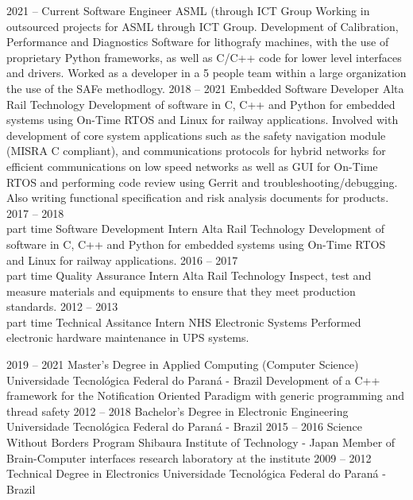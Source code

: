 \documentclass[9pt]{developercv} %
\begin{document}
\begin{entrylist}
	\entry
		{2021 -- Current}
		{Software Engineer}
		{ASML (through ICT Group}
		{Working in outsourced projects for ASML through ICT Group. Development of Calibration, Performance and Diagnostics Software for lithografy machines, with the use of proprietary Python frameworks, as well as C/C++ code for lower level interfaces and drivers. Worked as a developer in a 5 people team within a large organization the use of the SAFe methodlogy.}
	\entry
		{2018 -- 2021}
		{Embedded Software Developer}
		{Alta Rail Technology}
		{Development of software in C, C++ and Python for embedded systems using On-Time RTOS and
		Linux for railway applications. Involved with development of core system applications such
		as the safety navigation module (MISRA C compliant), and communications protocols for hybrid
		networks for efficient communications on low speed networks as well as GUI for On-Time RTOS
		and performing code review using Gerrit and troubleshooting/debugging. Also writing functional
		specification and risk analysis documents for products.}
	\entry
		{2017 -- 2018\\\footnotesize{part time}}
		{Software Development Intern}
		{Alta Rail Technology}
		{Development of software in C, C++ and Python for embedded systems using On-Time RTOS and 
		Linux for railway applications.}
	\entry
		{2016 -- 2017\\\footnotesize{part time}}
		{Quality Assurance Intern}
		{Alta Rail Technology}
		{Inspect, test and measure materials and equipments to ensure that they meet production standards.}
	\entry
		{2012 -- 2013\\\footnotesize{part time}}
		{Technical Assitance Intern}
		{NHS Electronic Systems}
		{Performed electronic hardware maintenance in UPS systems.}
\end{entrylist}



\begin{entrylist}
	\entry
		{2019 -- 2021}
		{Master's Degree in Applied Computing (Computer Science)}
		{Universidade Tecnológica Federal do Paraná - Brazil}
		{Development of a C++ framework for the Notification Oriented Paradigm with generic programming and thread safety}
	\entry
		{2012 -- 2018}
		{Bachelor's Degree in Electronic Engineering}
		{Universidade Tecnológica Federal do Paraná - Brazil}
		{}
	\entry
		{2015 -- 2016}
		{Science Without Borders Program}
		{Shibaura Institute of Technology - Japan}
		{Member of Brain-Computer interfaces research laboratory at the institute}
	\entry
		{2009 -- 2012}
		{Technical Degree in Electronics}
		{Universidade Tecnológica Federal do Paraná - Brazil}
		{}
\end{entrylist}
\end{document}
